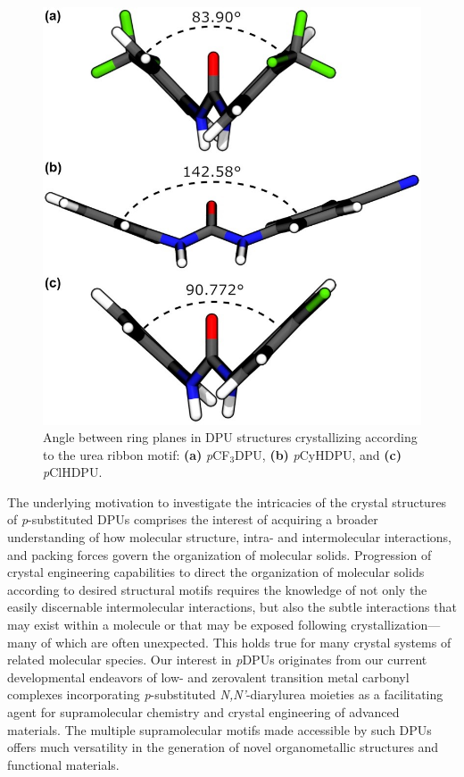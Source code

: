 \begin{figure}[h!]
    \centering
    \includegraphics[width=0.8\linewidth]{figures/pub3/Picture6.jpg}
    \caption{Angle between ring planes in DPU structures crystallizing according to the urea ribbon motif: \textbf{(a)} \textit{p}CF$_{3}$DPU, \textbf{(b)} \textit{p}CyHDPU, and \textbf{(c)} \textit{p}ClHDPU.}\label{fig:ribbon-angle}
\end{figure}

The underlying motivation to investigate the intricacies of the crystal structures of \textit{p}-substituted DPUs comprises the interest of acquiring a broader understanding of how molecular structure, intra- and intermolecular interactions, and packing forces govern the organization of molecular solids. Progression of crystal engineering capabilities to direct the organization of molecular solids according to desired structural motifs requires the knowledge of not only the easily discernable intermolecular interactions, but also the subtle interactions that may exist within a molecule or that may be exposed following crystallization---many of which are often unexpected. This holds true for many crystal systems of related molecular species. Our interest in \textit{p}DPUs originates from our current developmental endeavors of low- and zerovalent transition metal carbonyl complexes incorporating \textit{p}-substituted \textit{N,N'}-diarylurea moieties as a facilitating agent for supramolecular chemistry and crystal engineering of advanced materials. The multiple supramolecular motifs made accessible by such DPUs offers much versatility in the generation of novel organometallic structures and functional materials.

